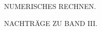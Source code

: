 \thispagestyle{empty}
\vspace*{.22\textheight}
\begin{center}
{\Large NUMERISCHES RECHNEN.}\par\bigskip
{\large NACHTRÄGE ZU BAND III.}
\end{center}
\clearpage
